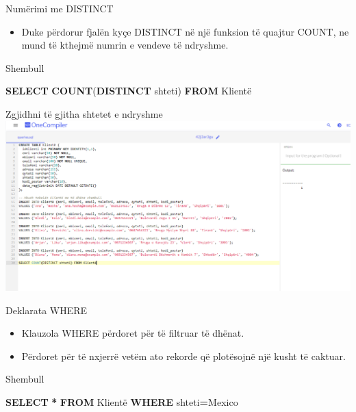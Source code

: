 \documentclass[
  ignorenonframetext,
]{beamer}
\newenvironment{Shaded}{\begin{snugshade}}{\end{snugshade}}
\newcommand{\FunctionTok}[1]{\textcolor[rgb]{0.13,0.29,0.53}{\textbf{#1}}}
\newcommand{\KeywordTok}[1]{\textcolor[rgb]{0.13,0.29,0.53}{\textbf{#1}}}
\newcommand{\NormalTok}[1]{#1}
\newcommand{\OperatorTok}[1]{\textcolor[rgb]{0.81,0.36,0.00}{\textbf{#1}}}
\newcommand{\StringTok}[1]{\textcolor[rgb]{0.31,0.60,0.02}{#1}}
\providecommand{\tightlist}{%
  \setlength{\itemsep}{0pt}\setlength{\parskip}{0pt}}
\begin{document}
\begin{frame}{Numërimi me DISTINCT}
\label{numuxebrimi-me-distinct}
\begin{itemize}
\tightlist
\item
  Duke përdorur fjalën kyçe DISTINCT në një funksion të quajtur COUNT,
  ne mund të kthejmë numrin e vendeve të ndryshme.
\end{itemize}
\end{frame}

\begin{frame}[fragile]{Shembull}
\label{shembull}
\begin{Shaded}
\begin{Highlighting}[]
\KeywordTok{SELECT} \FunctionTok{COUNT}\NormalTok{(}\KeywordTok{DISTINCT}\NormalTok{ shteti) }\KeywordTok{FROM}\NormalTok{ Klientë}
\end{Highlighting}
\end{Shaded}
\end{frame}

\begin{frame}{Zgjidhni të gjitha shtetet e ndryshme}
\label{zgjidhni-tuxeb-gjitha-shtetet-e-ndryshme-5}
\includegraphics{./Figs/query5.png}
\end{frame}

\begin{frame}{Deklarata WHERE}
\label{deklarata-where}
\begin{itemize}
\item
  Klauzola WHERE përdoret për të filtruar të dhënat.
\item
  Përdoret për të nxjerrë vetëm ato rekorde që plotësojnë një kusht të
  caktuar.
\end{itemize}
\end{frame}

\begin{frame}[fragile]{Shembull}
\label{shembull-1}
\begin{Shaded}
\begin{Highlighting}[]
\KeywordTok{SELECT} \OperatorTok{*} \KeywordTok{FROM}\NormalTok{ Klientë}
\KeywordTok{WHERE}\NormalTok{ shteti}\OperatorTok{=}\StringTok{\textquotesingle{}Mexico\textquotesingle{}}
\end{Highlighting}
\end{Shaded}
\end{frame}
\end{document}
